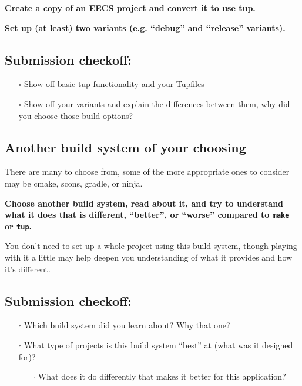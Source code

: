 \documentclass{article}
\begin{document}
\textbf{Create a copy of an EECS project and convert it to use tup.}

\textbf{Set up (at least) two variants (e.g. ``debug'' and ``release'' variants).}

\subsection*{Submission checkoff:}
\begin{itemize}
  \item[$\square$] Show off basic tup functionality and your Tupfiles
  \item[$\square$] Show off your variants and explain the differences between
    them, why did you choose those build options?
\end{itemize}

\subsection{Another build system of your choosing}
There are many to choose from, some of the more appropriate ones to consider
may be cmake, scons, gradle, or ninja.

\textbf{Choose another build system, read about it, and try to understand what
it does that is different, ``better'', or ``worse'' compared to \texttt{make} or
\texttt{tup}.}

You don't need to set up a whole project using this build system, though
playing with it a little may help deepen you understanding of what it provides
and how it's different.

\subsection*{Submission checkoff:}
\begin{itemize}
  \item[$\square$] Which build system did you learn about? Why that one?
  \item[$\square$] What type of projects is this build system ``best'' at
    (what was it designed for)?
    \begin{itemize}
      \item[$\square$] What does it do differently that makes it better for
        this application?
    \end{itemize}
\end{itemize}
\end{document}
